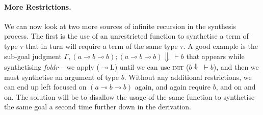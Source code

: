 \documentclass{llncs}
\newcommand{\lolli}{\multimap}
\newcommand{\mypara}[1]{\paragraph{\textbf{#1}.}}
\def\Rho{P}
\begin{document}


\mypara{More Restrictions} We can now look at two more sources of infinite
recursion in the synthesis process. The first is the use of an unrestricted
function to synthetise a term of type $\tau$ that in turn will require a term of
the same type $\tau$. A good example is the sub-goal judgment $\Gamma,(a \lolli
b \lolli b); (a \lolli b \lolli b) \Downarrow\ \vdash b$ that
appears while synthetising \emph{foldr} -- we apply ($\lolli$L)
until we can use \textsc{init} ($b \Downarrow\ \vdash b$), and then we must
synthetise an argument of type $b$. Without any additional restrictions, we
can end up left focused on $(a \lolli b \lolli b)$ again, and again require $b$,
and on and on. The solution will be to disallow the usage of the same function
to synthetise the same goal a second time further down in the derivation.
\end{document}
